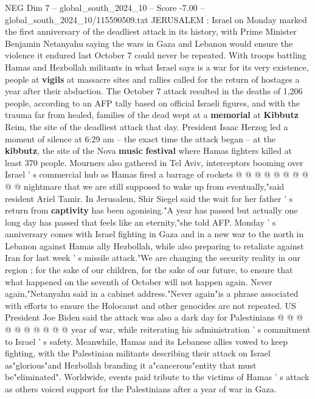 \begin{textsample}{NEG Dim 7 – global\_south\_2024\_10 – Score -7.00 – global\_south\_2024\_10/115590509.txt}  \label{ex:f7_neg_247}
JERUSALEM : Israel on Monday marked the first anniversary of the deadliest attack in its history, with Prime Minister Benjamin Netanyahu saying the wars in Gaza and Lebanon would ensure the violence it endured last October 7 could never be repeated.
With troops battling Hamas and Hezbollah militants in what Israel says is a war for its very existence, people at \textbf{vigils} at massacre sites and rallies called for the return of hostages a year after their abduction.
The October 7 attack resulted in the deaths of 1,206 people, according to an AFP tally based on official Israeli figures, and with the trauma far from healed, families of the dead wept at a \textbf{memorial} at \textbf{Kibbutz} Reim, the site of the deadliest attack that day.
President Isaac Herzog led a moment of silence at 6:29 am -- the exact time the attack began -- at the \textbf{kibbutz}, the site of the Nova \textbf{music} \textbf{festival} where Hamas fighters killed at least 370 people.
Mourners also gathered in Tel Aviv, interceptors booming over Israel ' s commercial hub as Hamas fired a barrage of rockets @ @ @ @ @ @ @ @ @ @ nightmare that we are still supposed to wake up from eventually,"said resident Ariel Tamir.
In Jerusalem, Shir Siegel said the wait for her father ' s return from \textbf{captivity} has been agonising."A year has passed but actually one long day has passed that feels like an eternity,"she told AFP.
Monday ' s anniversary comes with Israel fighting in Gaza and in a new war to the north in Lebanon against Hamas ally Hezbollah, while also preparing to retaliate against Iran for last week ' s missile attack."We are changing the security reality in our region ; for the sake of our children, for the sake of our future, to ensure that what happened on the seventh of October will not happen again.
Never again,"Netanyahu said in a cabinet address."Never again"is a phrase associated with efforts to ensure the Holocaust and other genocides are not repeated.
US President Joe Biden said the attack was also a dark day for Palestinians @ @ @ @ @ @ @ @ @ @ year of war, while reiterating his administration ' s commitment to Israel ' s safety.
Meanwhile, Hamas and its Lebanese allies vowed to keep fighting, with the Palestinian militants describing their attack on Israel as"glorious"and Hezbollah branding it a"cancerous"entity that must be"eliminated".
Worldwide, events paid tribute to the victims of Hamas ' s attack as others voiced support for the Palestinians after a year of war in Gaza.

\end{textsample}
